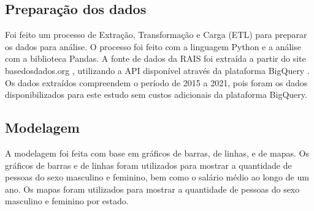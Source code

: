 \subsection{Preparação dos dados}

Foi feito um processo de Extração, Transformação e Carga (ETL) para preparar os dados para análise. O processo foi feito com a linguagem Python e a análise com a biblioteca Pandas. A fonte de dados da RAIS foi extraída a partir do site basedosdados.org \cite{basedosdados}, utilizando a API disponível através da plataforma BigQuery \cite{bigquery}. Os dados extraídos compreendem o período de 2015 a 2021, pois foram os dados disponibilizados para este estudo sem custos adicionais da plataforma BigQuery. 

\subsection{Modelagem}

A modelagem foi feita com base em gráficos de barras, de linhas, e de mapas. Os gráficos de barras e de linhas foram utilizados para mostrar a quantidade de pessoas do sexo masculino e feminino, bem como o salário médio ao longo de um ano. Os mapas foram utilizados para mostrar a quantidade de pessoas do sexo masculino e feminino por estado.